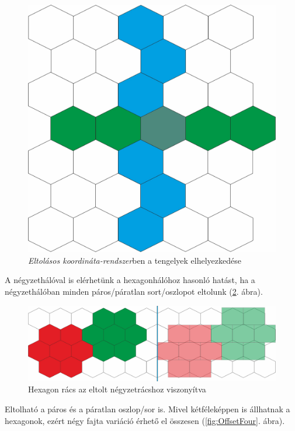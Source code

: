 \begin{figure}[h!]
\centering
\includegraphics[scale=0.2]{kepek/OffsetCoord.jpg}
\caption{\textit{Eltolásos koordináta-rendszer}ben a tengelyek elhelyezkedése}
\label{fig:OffsetCoord}
\end{figure}

A négyzethálóval is elérhetünk a hexagonhálóhoz hasonló hatást, ha a négyzethálóban minden páros/páratlan sort/oszlopot eltolunk (\ref{fig:Hex_Sq}. ábra).

\begin{figure}[h!]
\centering
\includegraphics[scale=0.25]{kepek/Hex_Sq.jpg}
\caption{Hexagon rács az eltolt négyzetrácshoz viszonyítva}
\label{fig:Hex_Sq}
\end{figure}

Eltolható a páros és a páratlan oszlop/sor is. Mivel kétféleképpen is állhatnak a hexagonok, ezért négy fajta variáció érhető el összesen (\ref{fig:OffsetFour}. ábra).

